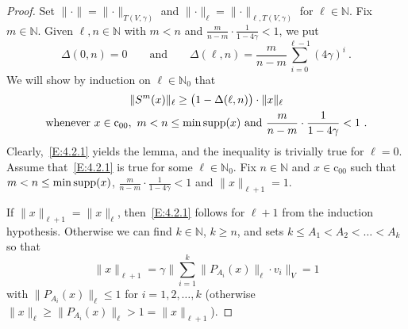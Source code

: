 \documentclass[11pt,leqno]{amsart}
\theoremstyle{definition}
\newcommand{\N}{\mathbb{N}}
\newcommand{\supp}{{\rm supp}}
\newcommand{\coo}{\mathrm{c}_{00}}
\newcommand{\norm}[1]{\lVert#1\rVert}
\begin{document}
\begin{proof}
  Set  $\norm{\cdot}=\norm{\cdot}_{T(V,\gamma)}$ and
  $\norm{\cdot}_\ell=\norm{\cdot}_{\ell,T(V,\gamma)}$ for
  $\ell\in\N$. Fix $m\in\N$. Given $\ell,n\in\N$ with $m<n$ and
  $\frac{m}{n-m}\cdot\frac1{1-4\gamma}<1$, we put
  $$\Delta(0,n)=0\qquad\text{and}\qquad\Delta(\ell,n)=
  \frac{m}{n-m}\sum_{i=0}^{\ell-1} (4\gamma)^i\ .$$
  We will show by induction on $\ell\in\N_0$ that
  \begin{multline}\label{E:4.2.1}\allowdisplaybreaks[1]
    \|S^m(x)\|_\ell\geq\big(1-\Delta(\ell,n)\big)\cdot\norm{x}_\ell\\
    \text{whenever } x\in\coo,\ m<n\leq\min\supp(x)\ \text{and}\
    \frac{m}{n-m}\cdot \frac1{1-4\gamma}<1\ .
  \end{multline}
  Clearly,~\eqref{E:4.2.1} yields the lemma, and  the inequality is
  trivially true for $\ell=0$. Assume that~\eqref{E:4.2.1} is true for
  some $\ell\in\N_0$. Fix $n\in\N$ and $x\in\coo$ such that
  $m<n\leq\min\supp(x)$, $\frac{m}{n-m}\cdot \frac1{1-4\gamma}<1$
  and $\|x\|_{\ell+1}=1$.

  If $\norm{x}_{\ell+1}=\norm{x}_\ell$, then~\eqref{E:4.2.1} follows for
  $\ell+1$ from the induction hypothesis. Otherwise we can find $k\in\N$,
  $k\ge n$, and sets $ k\leq A_1<A_2<\dots<A_k$ so that
  $$\|x\|_{\ell+1}=\gamma\Big\|\sum_{i=1}^k \|P_{A_i}(x)\|_\ell \cdot
  v_i\Big\|_V=1$$
  with  $\|P_{A_i}(x)\|_\ell\le1$ for $i=1,2,\ldots,k$ (otherwise
  $\|x\|_\ell\ge \|P_{A_i}(x)\|_\ell > 1= \|x\|_{\ell+1} $).


\end{proof}
\end{document}

